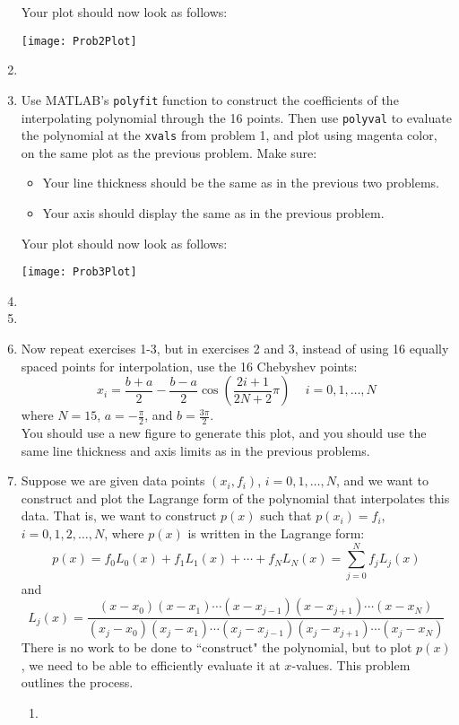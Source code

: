 \documentclass[12pt]{article}
\begin{document}
\begin{enumerate}
Your plot should now look as follows: 
\begin{center}
\texttt{[image: Prob2Plot]}
\end{center}
\item[]
\item
Use MATLAB's {\tt polyfit} function to construct the coefficients of the interpolating polynomial through the
16 points.  Then use {\tt polyval} to evaluate the polynomial at the {\tt xvals} from problem 1,
and plot using magenta color, on the same plot as the previous problem.  Make sure:
\begin{itemize}
\item
Your line thickness should be the same as in the previous two problems.
\item
Your axis should display the same as in the previous problem.
\end{itemize}
Your plot should now look 
as follows:
\begin{center}
\texttt{[image: Prob3Plot]}
\end{center}
\item[]
\item[]
\item
Now repeat exercises 1-3, but in exercises 2 and 3, instead of using 16 equally spaced points
for interpolation, use the 16 Chebyshev points:
$$
  x_i = \frac{b+a}{2} - \frac{b-a}{2} \cos\left( \frac{2i+1}{2N+2}\pi\right)\, \quad i = 0, 1, \ldots, N
$$
where $N = 15$, $a = -\frac{\pi}{2}$, and $b = \frac{3\pi}{2}$. \\
You should use a new figure to generate this plot, and you should use the same line thickness and axis limits
as in the previous problems.  
\item
Suppose we are given data points $(x_i,f_i)$, $i = 0, 1, \ldots, N$, and we want to construct
and plot the Lagrange form of the polynomial that interpolates this data.  That is, we want
to construct $p(x)$ such that $p(x_i) = f_i$, $i = 0, 1, 2, \ldots, N$, where $p(x)$ is written in
the Lagrange form:
$$
  p(x) = f_0 L_0(x) + f_1 L_1(x) + \cdots + f_N L_N(x) = \sum_{j=0}^N f_j L_j(x)
$$
and
$$
  L_j(x) = \frac{(x-x_0)(x-x_1)\cdots(x-x_{j-1})(x-x_{j+1})\cdots(x-x_N)}{(x_j-x_0)(x_j-x_1)\cdots(x_j-x_{j-1})(x_j-x_{j+1})\cdots(x_j-x_N)}
$$
There is no work to be done to ``construct" the polynomial, but to plot $p(x)$, we need
to be able to efficiently evaluate it at $x$-values.   This problem outlines the process.
\begin{enumerate}
\item

\end{enumerate}
\end{enumerate}
\end{document}
